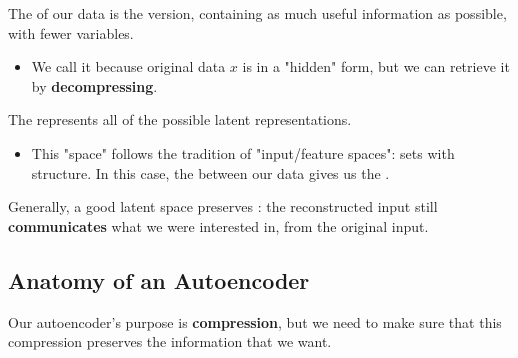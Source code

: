         \begin{definition}
            The  of our data is the  version, containing as much useful information as possible, with fewer variables.

            \begin{itemize}
                \item We call it  because original data $x$ is in a "hidden" form, but we can retrieve it by \textbf{decompressing}.
            \end{itemize}
            

            \subsecdiv

            The  represents all of the possible latent representations.
            \begin{itemize}
                \item This "space" follows the tradition of "input/feature spaces": sets with structure. In this case, the  between our data gives us the .
            \end{itemize}

            Generally, a good latent space preserves : the reconstructed input still \textbf{communicates} what we were interested in, from the original input.
            
        \end{definition}

    \subsection{Anatomy of an Autoencoder}

        Our autoencoder's purpose is \textbf{compression}, but we need to make sure that this compression preserves the information that we want.\\

